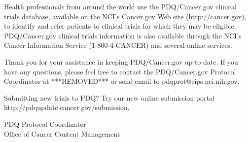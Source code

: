 \documentclass[letterpaper,12pt]{letter}
\begin{document}
Health professionals from around the world use the PDQ/Cancer.gov clinical
trials database, available on the NCI's Cancer.gov Web site
(http://cancer.gov), to identify and refer patients to clinical trials for
which they may be eligible.  PDQ/Cancer.gov clinical trials information is
also available through the NCI's Cancer Information Service (1-800-4-CANCER)
and several online services.

Thank you for your assistance in keeping PDQ/Cancer.gov up-to-date.  If you
have any questions, please feel free to contact the PDQ/Cancer.gov Protocol
Coordinator at ***REMOVED*** or send email to pdqprot@cips.nci.nih.gov.

Submitting new trials to PDQ?
Try our new online submission portal
http://pdqupdate.cancer.gov/submission.

\vspace{12pt}

PDQ Protocol Coordinator \\
Office of Cancer Content Management

\vfill
\end{document}

